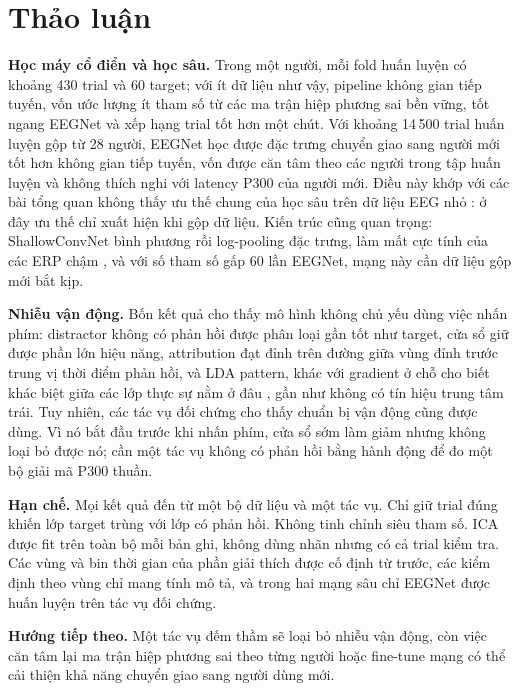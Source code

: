 \section{Thảo luận}
\label{ch:discussion}

\textbf{Học máy cổ điển và học sâu.} Trong một người, mỗi fold huấn luyện có khoảng 430 trial và 60 target; với ít dữ liệu như vậy, pipeline không gian tiếp tuyến, vốn ước lượng ít tham số từ các ma trận hiệp phương sai bền vững, tốt ngang EEGNet và xếp hạng trial tốt hơn một chút. Với khoảng 14\,500 trial huấn luyện gộp từ 28 người, EEGNet học được đặc trưng chuyển giao sang người mới tốt hơn không gian tiếp tuyến, vốn được căn tâm theo các người trong tập huấn luyện và không thích nghi với latency P300 của người mới. Điều này khớp với các bài tổng quan không thấy ưu thế chung của học sâu trên dữ liệu EEG nhỏ \citep{lotte2018,roy2019}: ở đây ưu thế chỉ xuất hiện khi gộp dữ liệu. Kiến trúc cũng quan trọng: ShallowConvNet bình phương rồi log-pooling đặc trưng, làm mất cực tính của các ERP chậm \citep{schirrmeister2017}, và với số tham số gấp 60 lần EEGNet, mạng này cần dữ liệu gộp mới bắt kịp.

\textbf{Nhiễu vận động.} Bốn kết quả cho thấy mô hình không chủ yếu dùng việc nhấn phím: distractor không có phản hồi được phân loại gần tốt như target, cửa sổ  giữ được phần lớn hiệu năng, attribution đạt đỉnh trên đường giữa vùng đỉnh trước trung vị thời điểm phản hồi, và LDA pattern, khác với gradient ở chỗ cho biết khác biệt giữa các lớp thực sự nằm ở đâu \citep{haufe2014}, gần như không có tín hiệu trung tâm trái. Tuy nhiên, các tác vụ đối chứng cho thấy chuẩn bị vận động cũng được dùng. Vì nó bắt đầu trước khi nhấn phím, cửa sổ sớm làm giảm nhưng không loại bỏ được nó; cần một tác vụ không có phản hồi bằng hành động để đo một bộ giải mã P300 thuần.

\textbf{Hạn chế.} Mọi kết quả đến từ một bộ dữ liệu và một tác vụ. Chỉ giữ trial đúng khiến lớp target trùng với lớp có phản hồi. Không tinh chỉnh siêu tham số. ICA được fit trên toàn bộ mỗi bản ghi, không dùng nhãn nhưng có cả trial kiểm tra. Các vùng và bin thời gian của phần giải thích được cố định từ trước, các kiểm định theo vùng chỉ mang tính mô tả, và trong hai mạng sâu chỉ EEGNet được huấn luyện trên tác vụ đối chứng.

\textbf{Hướng tiếp theo.} Một tác vụ đếm thầm sẽ loại bỏ nhiễu vận động, còn việc căn tâm lại ma trận hiệp phương sai theo từng người hoặc fine-tune mạng có thể cải thiện khả năng chuyển giao sang người dùng mới.
